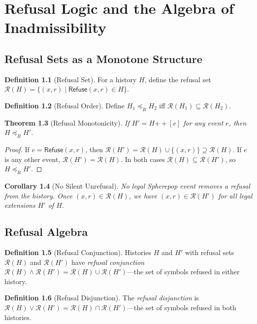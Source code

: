 \documentclass[12pt, a4paper, openany]{book}
\theoremstyle{plain}
\newtheorem{theorem}{Theorem}[chapter]
\newtheorem{corollary}[theorem]{Corollary}
\theoremstyle{definition}
\newtheorem{definition}[theorem]{Definition}
\theoremstyle{remark}
\newcommand{\Refuse}{\mathsf{Refuse}}
\newcommand{\calR}{\mathcal{R}}
\begin{document}
\chapter{Refusal Logic and the Algebra of Inadmissibility}

\section{Refusal Sets as a Monotone Structure}

\begin{definition}[Refusal Set]
For a history $H$, define the refusal set
$\calR(H) = \{(x, r) \mid \Refuse(x, r) \in H\}$.
\end{definition}

\begin{definition}[Refusal Order]
Define $H_1 \preceq_R H_2$ iff $\calR(H_1) \subseteq \calR(H_2)$.
\end{definition}

\begin{theorem}[Refusal Monotonicity]
If $H' = H \mathbin{++} [e]$ for any event $e$, then $H \preceq_R H'$.
\end{theorem}

\begin{proof}
If $e = \Refuse(x, r)$, then $\calR(H') = \calR(H) \cup \{(x,r)\} \supseteq \calR(H)$.
If $e$ is any other event, $\calR(H') = \calR(H)$. In both cases
$\calR(H) \subseteq \calR(H')$, so $H \preceq_R H'$.
\end{proof}

\begin{corollary}[No Silent Unrefusal]
No legal Spherepop event removes a refusal from the history. Once $(x, r) \in
\calR(H)$, we have $(x, r) \in \calR(H')$ for all legal extensions $H'$ of $H$.
\end{corollary}

\section{Refusal Algebra}

\begin{definition}[Refusal Conjunction]
Histories $H$ and $H'$ with refusal sets $\calR(H)$ and $\calR(H')$ have
\emph{refusal conjunction}
$\calR(H) \wedge \calR(H') = \calR(H) \cup \calR(H')$---the set of symbols
refused in either history.
\end{definition}

\begin{definition}[Refusal Disjunction]
The \emph{refusal disjunction} is
$\calR(H) \vee \calR(H') = \calR(H) \cap \calR(H')$---the set of symbols
refused in both histories.
\end{definition}
\end{document}
